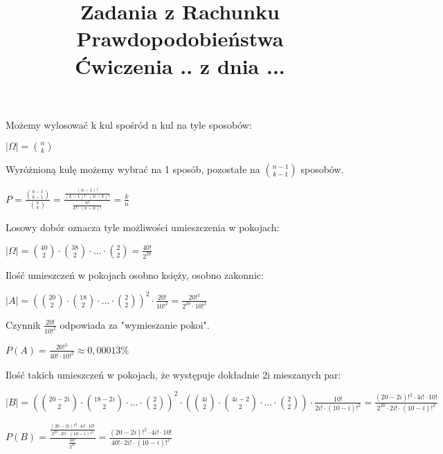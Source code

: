\documentclass[fleqn]{article}
\begin{document}
\title{Zadania z Rachunku Prawdopodobieństwa \\ Ćwiczenia .. z dnia ...}
\date{}
\medskip
{}
\medskip

Możemy wylosować k kul spośród n kul na tyle sposobów:

$|\Omega|={n\choose k}$

Wyróżnioną kulę możemy wybrać na 1 sposób, pozostałe na ${n-1\choose k-1}$ sposobów.

$P=\frac{{n-1\choose k-1}}{{n\choose k}}=\frac{\frac{(n-1)!}{(k-1)!\cdot(n-k)!}}{\frac{n!}{k!\cdot(n-k)!}}=\frac{k}{n}$

\medskip
{}
\medskip

Losowy dobór oznacza tyle możliwości umieszczenia w pokojach:

$|\Omega|={40\choose 2}\cdot{38\choose 2}\cdot...\cdot{2\choose 2}=\frac{40!}{2^{20}}$

Ilość umieszczeń w pokojach osobno księży, osobno zakonnic:

$|A|=\left({20\choose 2}\cdot{18\choose 2}\cdot...\cdot{2\choose 2}\right)^{2}\cdot\frac{20!}{10!^2}=\frac{20!^3}{2^{20}\cdot10!^2}$

Czynnik $\frac{20!}{10!^2}$ odpowiada za "wymieszanie pokoi".

$P(A)=\frac{20!^3}{40!\cdot10!^2}\approx0,00013\%$

Ilość takich umieszczeń w pokojach, że występuje dokładnie 2i mieszanych par:

$|B|=\left({20-2i\choose 2}\cdot{18-2i\choose 2}\cdot...\cdot{2\choose 2}\right)^{2}\cdot\left({4i\choose 2}\cdot{4i-2\choose 2}\cdot...\cdot{2\choose 2}\right)\cdot\frac{10!}{2i!\cdot(10-i)!^2}=\frac{(20-2i)!^2\cdot4i!\cdot10!}{2^{20}\cdot2i!\cdot(10-i)!^2}$

$P(B)=\frac{\frac{(20-2i)!^2\cdot4i!\cdot10!}{2^{20}\cdot2i!\cdot(10-i)!^2}}{\frac{40!}{2^{20}}}=\frac{(20-2i)!^2\cdot4i!\cdot10!}{40!\cdot2i!\cdot(10-i)!^2}$
\end{document}
